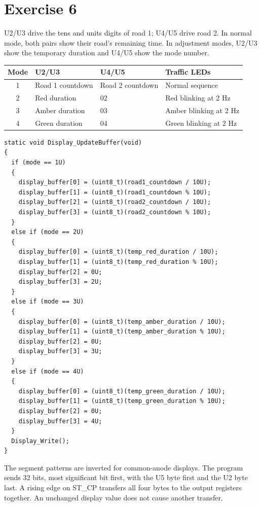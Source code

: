 \documentclass[12pt,a4paper]{article}
\begin{document}
\section{Exercise 6}

U2/U3 drive the tens and units digits of road 1; U4/U5 drive road 2.
In normal mode, both pairs show their road's remaining time. In adjustment
modes, U2/U3 show the temporary duration and U4/U5 show the mode number.

\begin{center}
\begin{tabular}{clll}
\hline
Mode & U2/U3 & U4/U5 & Traffic LEDs \\
\hline
1 & Road 1 countdown & Road 2 countdown & Normal sequence \\
2 & Red duration & 02 & Red blinking at 2 Hz \\
3 & Amber duration & 03 & Amber blinking at 2 Hz \\
4 & Green duration & 04 & Green blinking at 2 Hz \\
\hline
\end{tabular}
\end{center}

\noindent\begin{minipage}{\linewidth}
\begin{lstlisting}[caption={Preparing display values -- Exercise 6}]
static void Display_UpdateBuffer(void)
{
  if (mode == 1U)
  {
    display_buffer[0] = (uint8_t)(road1_countdown / 10U);
    display_buffer[1] = (uint8_t)(road1_countdown % 10U);
    display_buffer[2] = (uint8_t)(road2_countdown / 10U);
    display_buffer[3] = (uint8_t)(road2_countdown % 10U);
  }
  else if (mode == 2U)
  {
    display_buffer[0] = (uint8_t)(temp_red_duration / 10U);
    display_buffer[1] = (uint8_t)(temp_red_duration % 10U);
    display_buffer[2] = 0U;
    display_buffer[3] = 2U;
  }
  else if (mode == 3U)
  {
    display_buffer[0] = (uint8_t)(temp_amber_duration / 10U);
    display_buffer[1] = (uint8_t)(temp_amber_duration % 10U);
    display_buffer[2] = 0U;
    display_buffer[3] = 3U;
  }
  else if (mode == 4U)
  {
    display_buffer[0] = (uint8_t)(temp_green_duration / 10U);
    display_buffer[1] = (uint8_t)(temp_green_duration % 10U);
    display_buffer[2] = 0U;
    display_buffer[3] = 4U;
  }
  Display_Write();
}
\end{lstlisting}
\end{minipage}

The segment patterns are inverted for common-anode displays. The program sends
32 bits, most significant bit first, with the U5 byte first and the U2 byte last.
A rising edge on ST\_CP transfers all four bytes to the output registers together.
An unchanged display value does not cause another transfer.
\end{document}
